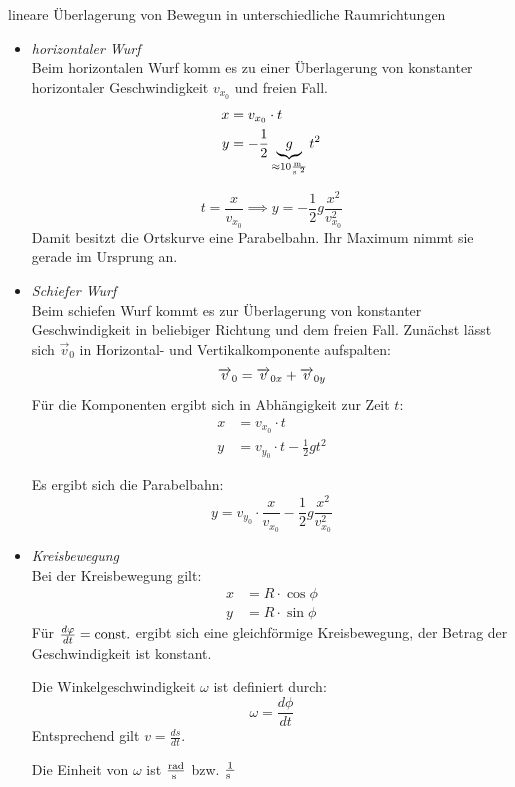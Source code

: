 \documentclass[a4paper,10pt]{scrartcl}
\begin{document}
\begin{seg}{lineare Überlagerung von Bewegun in unterschiedliche Raumrichtungen}
\begin{itemize}
\item \emph{horizontaler Wurf}\\
Beim horizontalen Wurf komm es zu einer Überlagerung von konstanter horizontaler Geschwindigkeit $v_{x_0}$ und freien Fall.
\begin{align*}
x&=v_{x_0}\cdot t\\
y&=-\frac 1 2 \underbrace{g}_{\approx 10\frac{\text{m }}{\text{s }^2}}t^2
\end{align*}
\begin{figure}[h]
\end{figure}
\[
t=\frac{x}{v_{x_0}} \implies \boxed{y=-\frac{1}{2} g \frac{x^2}{v_{x_0}^2}}
\]
Damit besitzt die Ortskurve eine Parabelbahn. Ihr Maximum nimmt sie gerade im Ursprung an.
\item \emph{Schiefer Wurf}\\
Beim schiefen Wurf kommt es zur Überlagerung von konstanter Geschwindigkeit in beliebiger Richtung und dem freien Fall. Zunächst lässt sich $\vec v_0$ in Horizontal- und Vertikalkomponente aufspalten:
\[
\overrightarrow{v}_0=\overrightarrow{v}_{0x}+\overrightarrow{v}_{0y}
\]
Für die Komponenten ergibt sich in Abhängigkeit zur Zeit $t$:
\begin{align*}
x&=v_{x_0}\cdot t\\
y&=v_{y_0}\cdot t-\frac{1}{2}gt^2
\end{align*}
\begin{figure}[h]
\end{figure}
Es ergibt sich die Parabelbahn:
\[
\boxed{y=v_{y_0}\cdot \frac{x}{v_{x_0}}-\frac 1 2 g \frac{x^2}{v_{x_0}^2}}
\]
\item \emph{Kreisbewegung}\\
Bei der Kreisbewegung gilt:
\begin{align*}
x&=R\cdot\cos{\phi}\\
y&=R\cdot\sin{\phi}
\end{align*}
Für $\frac{d\varphi}{dt}=\text{const.}$ ergibt sich eine gleichförmige Kreisbewegung, der Betrag der Geschwindigkeit ist konstant.  
\begin{df}[Winkelgeschwindigkeit]
Die Winkelgeschwindigkeit $\omega$ ist definiert durch:
\[
\omega =\frac{d\phi}{dt}
\]
Entsprechend gilt $v=\frac{ds}{dt}$.
\end{df}
Die Einheit von $\omega$ ist $\frac{\text{rad}}{\text{s }}$ bzw. $\frac 1 {\text{s }}$
\end{itemize}

\end{seg}
\end{document}
